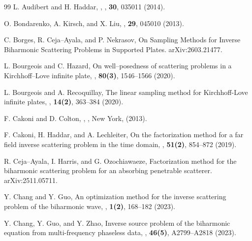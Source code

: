 \documentclass{article}
\numberwithin{equation}{section}
\begin{document}
{%
\begin{thebibliography}{99}
\newblock L. Audibert and H. Haddar, 
, 
, {\bf 30},  035011 (2014).


\newblock O. Bondarenko, A. Kirsch, and X. Liu,
, {\bf 29}, 045010 (2013).


\newblock C. Borges, R. Ceja--Ayala, and P. Nekrasov,
\newblock On Sampling Methods for Inverse Biharmonic Scattering Problems in Supported Plates. 
 arXiv:2603.21477.

\newblock L. Bourgeois and C. Hazard,
\newblock On well--posedness of scattering problems in a Kirchhoff--Love infinite plate,
, {\bf 80(3)}, 1546--1566 (2020). 


\newblock L. Bourgeois  and  A. Recoquillay, 
\newblock The linear sampling method for Kirchhoff-Love infinite plates, 
,  {\bf 14(2)}, 363--384 (2020).


\newblock F. Cakoni and D. Colton,
,
, {New York}, (2013).


\newblock F. Cakoni,  H. Haddar, and A. Lechleiter, 
\newblock On the factorization method for a far field inverse scattering problem in the time domain, 
, {\bf 51(2)}, 854--872 (2019).


\newblock R. Ceja--Ayala, I. Harris, and G. Ozochiawaeze, 
\newblock Factorization method for the biharmonic scattering problem for an absorbing penetrable scatterer. 
 arXiv:2511.05711.

\newblock  Y. Chang and  Y. Guo, 
\newblock An optimization method for the inverse scattering problem of the biharmonic wave,
,  {\bf 1(2)}, 168--182 (2023). 


\newblock  Y. Chang, Y. Guo, and Y. Zhao, 
\newblock Inverse source problem of the biharmonic equation from multi-frequency phaseless data,
,  {\bf 46(5)}, {A}2799--{A}2818 (2023). 



\end{thebibliography}}
\end{document}

